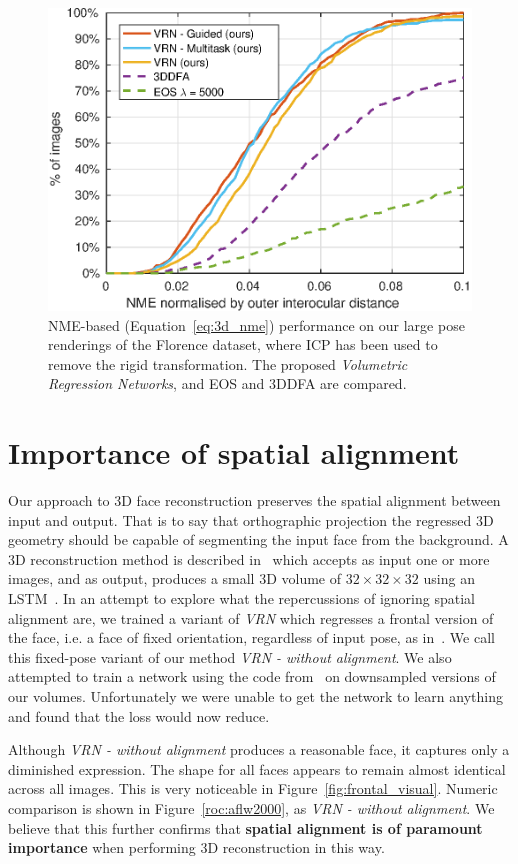 \begin{figure}
  \centering
  \includegraphics[width=0.75\linewidth]{curves-icp/florence.eps}
  \caption[NME performance on Florence with ICP Alignment]{NME-based
    (Equation~\ref{eq:3d_nme}) performance on our large pose
    renderings of the Florence dataset, where ICP has been used to
    remove the rigid transformation. The proposed \textit{Volumetric
      Regression Networks}, and EOS and 3DDFA are compared.}
  \label{roc:florenceicp}
\end{figure}


\section{Importance of spatial alignment}
\label{sec:spatialimportance}

Our approach to 3D face reconstruction preserves the spatial alignment
between input and output. That is to say that orthographic projection
the regressed 3D geometry should be capable of segmenting the input
face from the background. A 3D reconstruction method is described
in~\cite{choy20163d} which accepts as input one or more images, and as
output, produces a small 3D volume of $32 \times 32 \times 32$ using
an LSTM~\cite{hochreiter1997long}. In an attempt to explore what the
repercussions of ignoring spatial alignment are, we trained a variant
of \textit{VRN} which regresses a frontal version of the face, i.e. a
face of fixed orientation, regardless of input pose, as
in~\cite{choy20163d}. We call this fixed-pose variant of our method
\textit{VRN - without alignment}. We also attempted to train a network
using the code from~\cite{choy20163d} on downsampled versions of our
volumes. Unfortunately we were unable to get the network to learn
anything and found that the loss would now reduce.

Although \textit{VRN - without alignment} produces a reasonable face,
it captures only a diminished expression. The shape for all faces
appears to remain almost identical across all images. This is very
noticeable in Figure~\ref{fig:frontal_visual}. Numeric comparison is
shown in Figure~\ref{roc:aflw2000}, as \textit{VRN - without
  alignment}. We believe that this further confirms that
\textbf{spatial alignment is of paramount importance} when performing
3D reconstruction in this way.

